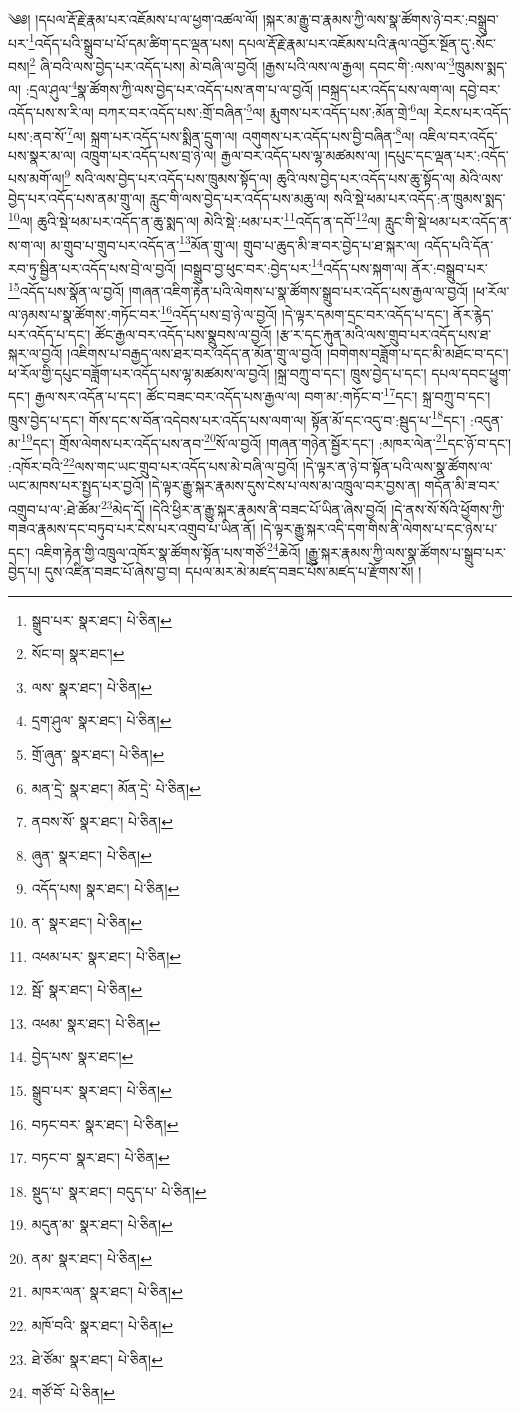 \setcounter{footnote}{0} 
༄༅། །དཔལ་རྡོ་རྗེ་རྣམ་པར་འཇོམས་པ་ལ་ཕྱག་འཚལ་ལོ། །སྐར་མ་རྒྱུ་བ་རྣམས་ཀྱི་ལས་སྣ་ཚོགས་ཉེ་བར་:བསྒྲུབ་པར་\footnote{སྒྲུབ་པར་  སྣར་ཐང་།  པེ་ཅིན། }འདོད་པའི་སྒྲུབ་པ་པོ་དམ་ཚིག་དང་ལྡན་པས། དཔལ་རྡོ་རྗེ་རྣམ་པར་འཇོམས་པའི་རྣལ་འབྱོར་སྔོན་དུ་:སོང་བས།\footnote{སོང་བ།  སྣར་ཐང་། } ཞི་བའི་ལས་བྱེད་པར་འདོད་པས། མེ་བཞི་ལ་བྱའོ། །རྒྱས་པའི་ལས་ལ་རྒྱལ། དབང་གི་:ལས་ལ་\footnote{ལས་  སྣར་ཐང་།  པེ་ཅིན། }ཁྲུམས་སྨད་ལ། :དྲལ་ཤུལ་\footnote{དྲག་ཤུལ་  སྣར་ཐང་།  པེ་ཅིན། }སྣ་ཚོགས་ཀྱི་ལས་བྱེད་པར་འདོད་པས་ནག་པ་ལ་བྱའོ། །བསྐྲད་པར་འདོད་པས་ལག་ལ། དབྱེ་བར་འདོད་པས་ས་རི་ལ། བཀར་བར་འདོད་པས་:གྲོ་བཞིན་\footnote{གྲོ་ཞུན་  སྣར་ཐང་།  པེ་ཅིན། }ལ། རྨུགས་པར་འདོད་པས་:མོན་གྲེ་\footnote{མན་དྲེ་  སྣར་ཐང་། མོན་དྲེ་  པེ་ཅིན། }ལ། རེངས་པར་འདོད་པས་:ནབ་སོ་\footnote{ནབས་སོ་  སྣར་ཐང་།  པེ་ཅིན། }ལ། སྐྲག་པར་འདོད་པས་སྨིན་དྲུག་ལ། འགུགས་པར་འདོད་པས་བྱི་བཞིན་\footnote{ཞུན་  སྣར་ཐང་།  པེ་ཅིན། }ལ། འཇིལ་བར་འདོད་པས་སྣར་མ་ལ། འཁྲུག་པར་འདོད་པས་བྲ་ཉེ་ལ། རྒྱལ་བར་འདོད་པས་ལྷ་མཚམས་ལ། །དཔུང་དང་ལྡན་པར་:འདོད་པས་མགོ་ལ།\footnote{འདོད་པས།  སྣར་ཐང་།  པེ་ཅིན། } སའི་ལས་བྱེད་པར་འདོད་པས་ཁྲུམས་སྟོད་ལ། ཆུའི་ལས་བྱེད་པར་འདོད་པས་ཆུ་སྟོད་ལ། མེའི་ལས་བྱེད་པར་འདོད་པས་ནམ་གྲུ་ལ། རླུང་གི་ལས་བྱེད་པར་འདོད་པས་མཆུ་ལ། སའི་སྡེ་ཕམ་པར་འདོད་:ན་ཁྲུམས་སྨད་\footnote{ན་  སྣར་ཐང་།  པེ་ཅིན། }ལ། ཆུའི་སྡེ་ཕམ་པར་འདོད་ན་ཆུ་སྨད་ལ། མེའི་སྡེ་:ཕམ་པར་\footnote{འཕམ་པར་  སྣར་ཐང་།  པེ་ཅིན། }འདོད་ན་དབོ་\footnote{སྦོ་  སྣར་ཐང་།  པེ་ཅིན། }ལ། རླུང་གི་སྡེ་ཕམ་པར་འདོད་ན་ས་ག་ལ། མ་གྲུབ་པ་གྲུབ་པར་འདོད་ན་\footnote{འཕམ་  སྣར་ཐང་།  པེ་ཅིན། }མོན་གྲུ་ལ། གྲུབ་པ་ཆུད་མི་ཟ་བར་བྱེད་པ་ཐ་སྐར་ལ། འདོད་པའི་དོན་རབ་ཏུ་སྦྱིན་པར་འདོད་པས་བྲེ་ལ་བྱའོ། །བསྒྲུབ་བྱ་ཕུང་བར་:བྱེད་པར་\footnote{བྱེད་པས་  སྣར་ཐང་། }འདོད་པས་སྐག་ལ། ནོར་:བསྒྲུབ་པར་\footnote{སྒྲུབ་པར་  སྣར་ཐང་།  པེ་ཅིན། }འདོད་པས་སྣོན་ལ་བྱའོ། །གཞན་འཇིག་རྟེན་པའི་ལེགས་པ་སྣ་ཚོགས་སྒྲུབ་པར་འདོད་པས་རྒྱལ་ལ་བྱའོ། །ཕ་རོལ་ལ་ཉམས་པ་སྣ་ཚོགས་:གཏོང་བར་\footnote{བཏང་བར་  སྣར་ཐང་།  པེ་ཅིན། }འདོད་པས་བྲ་ཉེ་ལ་བྱའོ། །དེ་ལྟར་དམག་དྲང་བར་འདོད་པ་དང་། ནོར་རྙེད་པར་འདོད་པ་དང་། ཚོང་རྒྱལ་བར་འདོད་པས་སྣྲུབས་ལ་བྱའོ། །རྩ་ར་དང་རྐུན་མའི་ལས་གྲུབ་པར་འདོད་པས་ཐ་སྐར་ལ་བྱའོ། །འཇིགས་པ་བརྒྱད་ལས་ཐར་བར་འདོད་ན་མོན་གྲུ་ལ་བྱའོ། །བགེགས་བཟློག་པ་དང་མི་མཐོང་བ་དང་། ཕ་རོལ་གྱི་དཔུང་བཟློག་པར་འདོད་པས་ལྷ་མཚམས་ལ་བྱའོ། །སྐྲ་བཀྲུ་བ་དང་། ཁྲུས་བྱེད་པ་དང་། དཔལ་དབང་ཕྱུག་དང་། རྒྱལ་སར་འདོན་པ་དང་། ཚོང་བཟང་བར་འདོད་པས་རྒྱལ་ལ། བག་མ་:གཏོང་བ་\footnote{བཏང་བ་  སྣར་ཐང་།  པེ་ཅིན། }དང་། སྐྲ་བཀྲུ་བ་དང་། ཁྲུས་བྱེད་པ་དང་། གོས་དང་ས་བོན་འདེབས་པར་འདོད་པས་ལག་ལ། སྟོན་མོ་དང་འདུ་བ་:སྦུད་པ་\footnote{སྡུད་པ་  སྣར་ཐང་། བདུད་པ་  པེ་ཅིན། }དང་། :འདུན་མ་\footnote{མདུན་མ་  སྣར་ཐང་།  པེ་ཅིན། }དང་། གྲོས་ལེགས་པར་འདོད་པས་ནབ་\footnote{ནམ་  སྣར་ཐང་།  པེ་ཅིན། }སོ་ལ་བྱའོ། །གཞན་གཉེན་སྦྱོར་དང་། :མཁར་ལེན་\footnote{མཁར་ལན་  སྣར་ཐང་།  པེ་ཅིན། }དང་ཉོ་བ་དང་། :འཁོར་བའི་\footnote{མཁོ་བའི་  སྣར་ཐང་།  པེ་ཅིན། }ལས་གང་ཡང་གྲུབ་པར་འདོད་པས་མེ་བཞི་ལ་བྱའོ། །དེ་ལྟར་ན་ཉེ་བ་སྟོན་པའི་ལས་སྣ་ཚོགས་ལ་ཡང་མཁས་པར་སྤྱད་པར་བྱའོ། །དེ་ལྟར་རྒྱུ་སྐར་རྣམས་དུས་ངེས་པ་ལས་མ་འཁྲུལ་བར་བྱས་ན། གདོན་མི་ཟ་བར་འགྲུབ་པ་ལ་:ཐེ་ཚོམ་\footnote{ཐེ་ཙོམ་  སྣར་ཐང་།  པེ་ཅིན། }མེད་དོ། །དེའི་ཕྱིར་ན་རྒྱུ་སྐར་རྣམས་ནི་བཟང་པོ་ཡིན་ཞེས་བྱའོ། །དེ་ནས་སོ་སོའི་ཕྱོགས་ཀྱི་གཟའ་རྣམས་དང་བཏུབ་པར་ངེས་པར་འགྲུབ་པ་ཡིན་ནོ། །དེ་ལྟར་རྒྱུ་སྐར་འདི་དག་གིས་ནི་ལེགས་པ་དང་ཉེས་པ་དང་། འཇིག་རྟེན་གྱི་འཁྲུལ་འཁོར་སྣ་ཚོགས་སྟོན་པས་གཙོ་\footnote{གཙོ་བོ་  པེ་ཅིན། }ཆེའོ། །རྒྱུ་སྐར་རྣམས་ཀྱི་ལས་སྣ་ཚོགས་པ་སྒྲུབ་པར་བྱེད་པ། དུས་འཛིན་བཟང་པོ་ཞེས་བྱ་བ། དཔལ་མར་མེ་མཛད་བཟང་པོས་མཛད་པ་རྫོགས་སོ། ། 